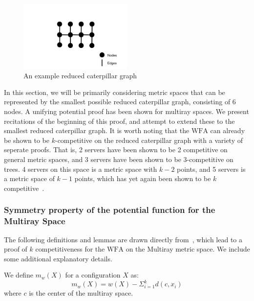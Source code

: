 \begin{figure}[H]
    \centering
    \includegraphics[width=0.5\textwidth]{images/reducedCaterpillar.png}
    \caption{An example reduced caterpillar graph}
\end{figure}

In this section, we will be primarily considering metric spaces that can be represented by the smallest possible reduced caterpillar graph, consisting of 6 nodes. A unifying potential proof has been shown for multiray spaces. We present recitations of the beginning of this proof, and attempt to extend these to the smallest reduced caterpillar graph. It is worth noting that the $\mathrm{WFA}$ can already be shown to be $k$-competitive on the reduced caterpillar graph with a variety of seperate proofs. That is, 2 servers have been shown to be 2 competitive on general metric spaces, and 3 servers have been shown to be $3$-competitive on trees. 4 servers on this space is a metric space with $k-2$ points, and 5 servers is a metric space of $k-1$ points, which has yet again been shown to be $k$ competitive~\cite{unifyingPotential2021}.

\subsubsection*{Symmetry property of the potential function for the Multiray Space}

The following definitions and lemmas are drawn directly from~\cite{unifyingPotential2021}, which lead to a proof of $k$ competitiveness for the $\mathrm{WFA}$ on the Multiray metric space. We include some additional explanatory details.

\begin{definition}
    \label{def:mw}
    We define $m_w(X)$ for a configuration $X$ as:
    \begin{equation*}
        m_w(X) = w(X) - \Sigma_{i=1} ^ k d(c, x_i)
    \end{equation*}
    where $c$ is the center of the multiray space.
\end{definition}

